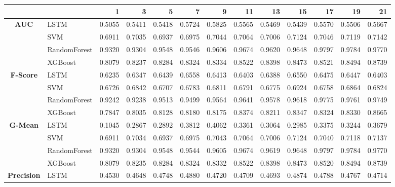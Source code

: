 \begin{table}[h]
	\centering
	\begin{adjustbox}{max width=15cm}
		\begin{tabular}{|c|l|r|r|r|r|r|r|r|r|r|r|r|}
			\hline
			&         &      1  &      3  &      5  &      7  &      9  &      11 &      13 &      15 &      17 &      19 &      21 \\
			\hline
			\textbf{AUC} & LSTM &  0.5055 &  0.5411 &  0.5418 &  0.5724 &  0.5825 &  0.5565 &  0.5469 &  0.5439 &  0.5570 &  0.5506 &  0.5667 \\
			& SVM &  0.6911 &  0.7035 &  0.6937 &  0.6975 &  0.7044 &  0.7064 &  0.7006 &  0.7124 &  0.7046 &  0.7119 &  0.7142 \\
			& RandomForest &  0.9320 &  0.9304 &  0.9548 &  0.9546 &  0.9606 &  0.9674 &  0.9620 &  0.9648 &  0.9797 &  0.9784 &  0.9770 \\
			& XGBoost &  0.8079 &  0.8237 &  0.8284 &  0.8324 &  0.8334 &  0.8522 &  0.8398 &  0.8473 &  0.8521 &  0.8494 &  0.8739 \\
			\hline
			\textbf{F-Score} & LSTM &  0.6235 &  0.6347 &  0.6439 &  0.6558 &  0.6413 &  0.6403 &  0.6388 &  0.6550 &  0.6475 &  0.6447 &  0.6403 \\
			& SVM &  0.6726 &  0.6842 &  0.6707 &  0.6783 &  0.6811 &  0.6791 &  0.6775 &  0.6924 &  0.6758 &  0.6864 &  0.6824 \\
			& RandomForest &  0.9242 &  0.9238 &  0.9513 &  0.9499 &  0.9564 &  0.9641 &  0.9578 &  0.9618 &  0.9775 &  0.9761 &  0.9749 \\
			& XGBoost &  0.7847 &  0.8035 &  0.8128 &  0.8180 &  0.8175 &  0.8374 &  0.8211 &  0.8347 &  0.8324 &  0.8330 &  0.8665 \\
			\hline
			\textbf{G-Mean} & LSTM &  0.1045 &  0.2867 &  0.2892 &  0.3812 &  0.4062 &  0.3361 &  0.3064 &  0.2985 &  0.3375 &  0.3244 &  0.3679 \\
			& SVM &  0.6911 &  0.7034 &  0.6937 &  0.6975 &  0.7043 &  0.7064 &  0.7006 &  0.7124 &  0.7040 &  0.7118 &  0.7137 \\
			& RandomForest &  0.9320 &  0.9304 &  0.9548 &  0.9544 &  0.9605 &  0.9674 &  0.9619 &  0.9648 &  0.9797 &  0.9784 &  0.9770 \\
			& XGBoost &  0.8079 &  0.8235 &  0.8284 &  0.8324 &  0.8332 &  0.8522 &  0.8398 &  0.8473 &  0.8520 &  0.8494 &  0.8739 \\
			\hline
			\textbf{Precision} & LSTM &  0.4530 &  0.4648 &  0.4748 &  0.4880 &  0.4720 &  0.4709 &  0.4693 &  0.4874 &  0.4788 &  0.4767 &  0.4714 \\

\end{tabular}
\end{adjustbox}
\end{table}
